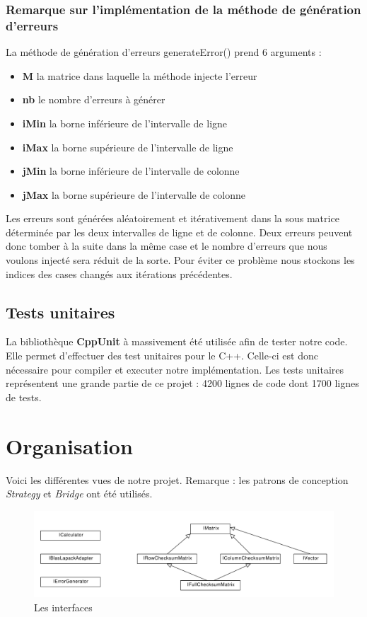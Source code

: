 \documentclass[a4paper, 10pt]{report}
\begin{document}
\subsubsection{Remarque  sur l’implémentation de la méthode de génération d’erreurs }
La méthode de génération d’erreurs generateError() prend 6 arguments :
\begin{itemize}
 \item \textbf{M} la matrice dans laquelle la méthode injecte l'erreur
 \item \textbf{nb} le nombre d'erreurs à générer
 \item \textbf{iMin} la borne inférieure de l'intervalle de ligne
 \item \textbf{iMax} la borne supérieure de l'intervalle de ligne
 \item \textbf{jMin} la borne inférieure de l'intervalle de colonne
 \item \textbf{jMax} la borne supérieure de l'intervalle de colonne
\end{itemize}
Les erreurs sont générées aléatoirement et itérativement dans la sous matrice déterminée par les deux intervalles de 
ligne et de colonne. Deux erreurs peuvent donc tomber à la suite dans la même case et le nombre d’erreurs que nous 
voulons injecté sera réduit de la sorte. Pour éviter ce problème nous stockons les indices des cases changés aux 
itérations précédentes.

\subsection{Tests unitaires}
La bibliothèque \textbf{CppUnit} \cite{CppUnit} à massivement été utilisée afin de tester notre code.
Elle permet d'effectuer des test unitaires pour le C++.\newline
Celle-ci est donc nécessaire pour compiler et executer notre implémentation.\newline
Les tests unitaires représentent une grande partie de ce projet : 4200 lignes de code dont 1700 lignes de tests.

\section{Organisation}
Voici les différentes vues de notre projet.\newline
Remarque : les patrons de conception \textit{Strategy} et \textit{Bridge} ont été utilisés.\newline

\begin{figure}[h]
\includegraphics[scale=0.4]{interfaces.pdf}
\caption{Les interfaces}
\end{figure}
\end{document}
